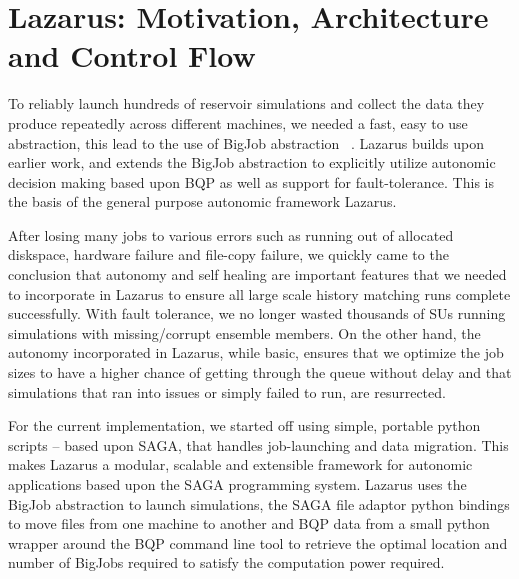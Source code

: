 \documentclass[conference,final]{IEEEtran}
\newcommand{\jhanote}[1]{ {\textcolor{red} { ***Jha: #1 }}}
\newcommand{\yyenote}[1]{ {\textcolor{blue} { ***yye00: #1 }}}
\newcommand{\jhanote}[1]{}
\newcommand{\yyenote}[1]{}
\begin{document}


\section{Lazarus: Motivation, Architecture and Control Flow}


To reliably launch hundreds of reservoir simulations and collect the
data they produce repeatedly across different machines, we needed a
fast, easy to use abstraction, this lead to the use of BigJob
abstraction ~\cite{ICCS_paper, saga_royalsoc}.  Lazarus builds upon
earlier work, and extends the BigJob abstraction to explicitly utilize
autonomic decision making based upon BQP as well as support for
fault-tolerance. This is the basis of the general purpose autonomic
framework Lazarus.

After losing many jobs to various errors
such as running out of allocated diskspace, hardware failure
and file-copy failure, we quickly came to the conclusion that autonomy
and self healing are important features that we needed to incorporate 
in Lazarus to ensure all large scale history matching runs
complete successfully. With fault tolerance, we no longer wasted
thousands of SUs running simulations with missing/corrupt ensemble members.
On the other hand, the autonomy incorporated in Lazarus, while basic,
ensures that we optimize the job sizes to have a higher chance of getting
through the queue without delay and that simulations
that ran into issues or simply failed to run, are resurrected.

For the current implementation, we started off using simple, portable
python scripts -- based upon SAGA, that handles job-launching and data
migration. This makes Lazarus a modular, scalable and extensible
framework for autonomic applications based upon the SAGA programming
system.  Lazarus uses the BigJob abstraction to launch simulations,
the SAGA file adaptor python bindings to move files from one machine
to another and BQP data from a small python wrapper around the BQP
command line tool to retrieve the optimal location and number of
BigJobs required to satisfy the computation power required.
\end{document}
